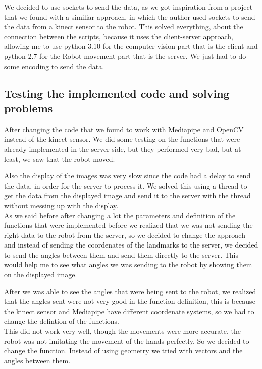\documentclass[conference]{IEEEtran}
\begin{document}
We decided to use sockets to send the data, as we got inspiration from a project that we found with a similiar approach, in which the author used sockets to send the data from a kinect sensor to the robot.
This solved everything, about the connection between the scripts, because it uses the client-server approach, allowing me to use python 3.10 for the computer vision part that is the client and python 2.7 for the Robot movement part that is the server. We just had to do some encoding to send the data. 

\subsection{Testing the implemented code and solving problems}
After changing the code that we found to work with Mediapipe and OpenCV instead of the kinect sensor. We did some testing on the functions that were already implemented in the server side, but they performed very bad, but at least, we saw that the robot moved.

Also the display of the images was very slow since the code had a delay to send the data, in order for the server to process it. We solved this using a thread to get the data from the displayed image and send it to the server with the thread without messing up with the display.
\\
As we said before after changing a lot the parameters and definition of the functions that were implemented before we realized that we was not sending the right data to the robot from the server, so we decided to change the approach and instead of sending the coordenates of the landmarks to the server, we decided to send the angles between them and send them directly to the server. This would help me to see what angles we was sending to the robot by showing them on the displayed image.

After we was able to see the angles that were being sent to the robot, we realized that the angles sent were not very good in the function definition, this is because the kinect sensor and Mediapipe have different coordenate systems, so we had to change the defintion of the functions.
\\
This did not work very well, though the movements were more accurate, the robot was not imitating the movement of the hands perfectly. So we decided to change the function. Instead of using geometry we tried with vectors and the angles between them.
\end{document}
